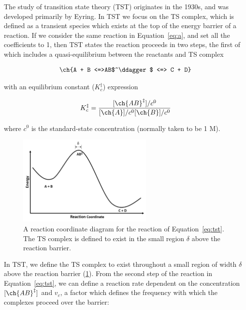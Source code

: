 The study of transition state theory (TST) originates in the 1930s, and was developed primarily by Eyring.\cite{McQuarrie1997,Steinfeld1998} In TST we focus on the TS complex, which is defined as a transient species which exists at the top of the energy barrier of a reaction. If we consider the same reaction in Equation~\ref{eq:a}, and set all the coefficients to 1, then TST states the reaction proceeds in two steps, the first of which includes a quasi-equilibrium between the reactants and TS complex

\begin{equation}
  \ch{A + B <=>AB$^\ddagger$ <=> C + D}
  \label{eq:tst}
\end{equation}

\noindent with an equilibrium constant ($K_c^{\ddagger}$) expression

\begin{equation}
  K_c^{\ddagger} = \frac{[\ch{AB}^\ddagger]/c^0}{[\ch{A}]/c^0[\ch{B}]/c^0}
\label{eq:K}
\end{equation}

\noindent where $c^0$ is the standard-state concentration (normally taken to be 1 M).

\begin{figure}[htb]
    \centering
    \includegraphics[width=0.6\textwidth]{figures/TST-PES.png}
    \caption[A reaction coordinate diagram for a generic reaction.]{A reaction coordinate diagram for the reaction of Equation~\ref{eq:tst}. The TS complex is defined to exist in the small region $\delta$ above the reaction barrier.}
\label{fig:tst-pes}
\end{figure}

In TST, we define the TS complex to exist throughout a small region of width $\delta$ above the reaction barrier (\ref{fig:tst-pes}). From the second step of the reaction in Equation~\ref{eq:tst}, we can define a reaction rate dependent on the concentration $[\ch{AB}^\ddagger]$ and $v_c$, a factor which defines the frequency with which the complexes proceed over the barrier:

